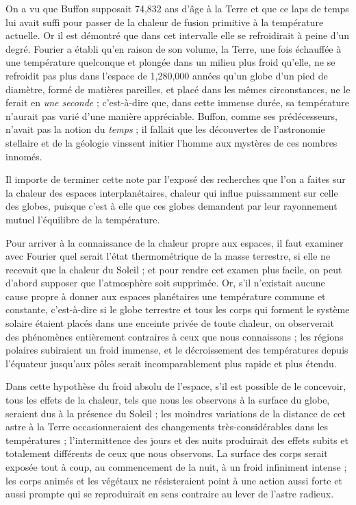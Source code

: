\documentclass[a4paper, 11pt, oneside]{article}
\begin{document}
On a vu que Buffon supposait 74,832 ans d'âge à la Terre et que ce laps de temps lui avait suffi pour passer de la chaleur de fusion primitive à la température actuelle. Or il est démontré que dans cet intervalle elle se refroidirait à peine d'un degré. Fourier a établi qu'en raison de son volume, la Terre, une fois échauffée à une température quelconque et plongée dans un milieu plus froid qu'elle, ne se refroidit pas plus dans l'espace de 1,280,000 années qu'un globe d'un pied de diamètre, formé de matières pareilles, et placé dans les mêmes circonstances, ne le ferait en \emph{une seconde} ; c'est-à-dire que, dans cette immense durée, sa température n'aurait pas varié d'une manière appréciable. Buffon, comme ses prédécesseurs, n'avait pas la notion du \emph{temps} ; il fallait que les découvertes de l'astronomie stellaire et de la géologie vinssent initier l'homme aux mystères de ces nombres innomés.

Il importe de terminer cette note par l'exposé des recherches que l'on a faites sur la chaleur des espaces interplanétaires, chaleur qui influe puissamment sur celle des globes, puisque c'est à elle que ces globes demandent par leur rayonnement mutuel l'équilibre de la température.

Pour arriver à la connaissance de la chaleur propre aux espaces, il faut examiner avec Fourier quel serait l'état thermométrique de la masse terrestre, si elle ne recevait que la chaleur du Soleil ; et pour rendre cet examen plus facile, on peut d'abord supposer que l'atmosphère soit supprimée. Or, s'il n'existait aucune cause propre à donner aux espaces planétaires une température commune et constante, c'est-à-dire si le globe terrestre et tous les corps qui forment le système solaire étaient placés dans une enceinte privée de toute chaleur, on observerait des phénomènes entièrement contraires à ceux que nous connaissons ; les régions polaires subiraient un froid immense, et le décroissement des températures depuis l'équateur jusqu'aux pôles serait incomparablement plus rapide et plus étendu.

Dans cette hypothèse du froid absolu de l'espace, s'il est possible de le concevoir, tous les effets de la chaleur, tels que nous les observons à la surface du globe, seraient dus à la présence du Soleil ; les moindres variations de la distance de cet astre à la Terre occasionneraient des changements très-considérables dans les températures ; l'intermittence des jours et des nuits produirait des effets subits et totalement différents de ceux que nous observons. La surface des corps serait exposée tout à coup, au commencement de la nuit, à un froid infiniment intense ; les corps animés et les végétaux ne résisteraient point à une action aussi forte et aussi prompte qui se reproduirait en sens contraire au lever de l'astre radieux.
\end{document}
